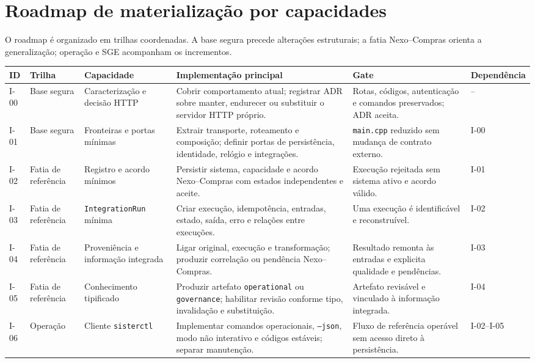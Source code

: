 \documentclass[11pt,a4paper,oneside]{article}
\begin{document}
\section{Roadmap de materialização por capacidades}

O roadmap é organizado em trilhas coordenadas. A base segura precede alterações estruturais; a fatia Nexo--Compras orienta a generalização; operação e SGE acompanham os incrementos.

\begin{landscape}
\scriptsize
\begin{longtable}{P{1.4cm}P{2.4cm}P{4.2cm}P{6.0cm}P{5.4cm}P{2.5cm}}
\toprule
\textbf{ID} & \textbf{Trilha} & \textbf{Capacidade} & \textbf{Implementação principal} & \textbf{Gate} & \textbf{Dependência} \\
\midrule
\endhead
I-00 & Base segura & Caracterização e decisão HTTP & Cobrir comportamento atual; registrar ADR sobre manter, endurecer ou substituir o servidor HTTP próprio. & Rotas, códigos, autenticação e comandos preservados; ADR aceita. & -- \\
I-01 & Base segura & Fronteiras e portas mínimas & Extrair transporte, roteamento e composição; definir portas de persistência, identidade, relógio e integrações. & \texttt{main.cpp} reduzido sem mudança de contrato externo. & I-00 \\
I-02 & Fatia de referência & Registro e acordo mínimos & Persistir sistema, capacidade e acordo Nexo--Compras com estados independentes e aceite. & Execução rejeitada sem sistema ativo e acordo válido. & I-01 \\
I-03 & Fatia de referência & \texttt{IntegrationRun} mínima & Criar execução, idempotência, entradas, estado, saída, erro e relações entre execuções. & Uma execução é identificável e reconstruível. & I-02 \\
I-04 & Fatia de referência & Proveniência e informação integrada & Ligar original, execução e transformação; produzir correlação ou pendência Nexo--Compras. & Resultado remonta às entradas e explicita qualidade e pendências. & I-03 \\
I-05 & Fatia de referência & Conhecimento tipificado & Produzir artefato \texttt{operational} ou \texttt{governance}; habilitar revisão conforme tipo, invalidação e substituição. & Artefato revisável e vinculado à informação integrada. & I-04 \\
I-06 & Operação & Cliente \texttt{sisterctl} & Implementar comandos operacionais, \texttt{--json}, modo não interativo e códigos estáveis; separar manutenção. & Fluxo de referência operável sem acesso direto à persistência. & I-02--I-05 \\

\end{longtable}
\end{landscape}
\end{document}
